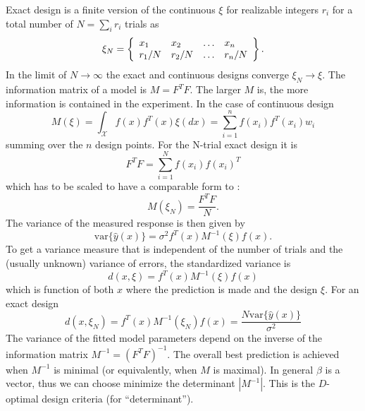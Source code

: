 \documentclass[12pt]{iopart}
\begin{document}
Exact design is a finite version of the continuous $\xi$ for realizable integers $r_i$ for a total number of $N = \sum_i r_i$ trials as
\begin{equation}
\xi_N = \left\{
  \begin{array}{l l l l}
    x_1 & x_2 & \ldots & x_n\\
    r_1/N & r_2/N & \ldots & r_n/N\\
  \end{array} \right \}.
\label{eq:xiexact}
\end{equation}
In the limit of $N \rightarrow \infty$ the exact and continuous designs converge $\xi_N \rightarrow \xi$.
The information matrix of a model is $M = F^T F$. The larger $M$ is, the more information is contained in the experiment. In the case of continuous design
\begin{equation}
M(\xi) = \int_{\mathcal{X}} f(x)f^T(x) \xi(dx) = \sum_{i=1}^n f(x_i)f^T(x_i)w_i
\label{eq:infcont}
\end{equation}
summing over the $n$ design points.
For the N-trial exact design it is
\begin{equation}
F^T F = \sum_{i=1}^N f(x_i) f(x_i)^T
\end{equation}
which has to be scaled to have a comparable form to :
\begin{equation}
M(\xi_N) = \frac{F^T F}{N}.
\end{equation}
The variance of the measured response is then given by
\begin{equation}
\mathrm{var}\{\hat y(x)\} = \sigma^2 f^T(x) M^{-1}(\xi) f(x).
\end{equation}
To get a variance measure that is independent of the number of trials and the (usually unknown) variance of errors, the standardized variance is
\begin{equation}
d(x, \xi) = f^T(x) M^{-1}(\xi) f(x)
\label{eq:stdvar}
\end{equation}
which is function of both $x$ where the prediction is made and the design $\xi$.
For an exact design
\begin{equation}
d(x, \xi_N) = f^T(x) M^{-1}(\xi_N) f(x) = \frac{N \mathrm{var}\{\hat y(x)\}}{\sigma^2}
\label{eq:stdvarn}
\end{equation}
The variance of the fitted model parameters  depend on the inverse of the information matrix $M^{-1} = \left(F^TF\right)^{-1}$. The overall best prediction is achieved when $M^{-1}$ is minimal (or equivalently, when $M$ is maximal). In general $\beta$ is a vector, thus we can choose minimize the determinant $|M^{-1}|$. This is the $D$-optimal design criteria (for ``determinant'').
\end{document}

